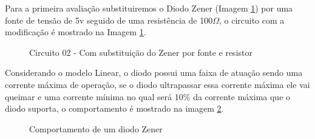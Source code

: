 Para a primeira avaliação substituiremos o Diodo Zener (Imagem \ref{fig:Circuito02}) por uma fonte de tensão de 5v seguido de uma resistência de 100$\Omega$, o circuito com a modificação é mostrado na Imagem \ref{fig:Circuito02}.

\begin{figure}[H]
    \centering
    \caption{Circuito 02 - Com substituição do Zener por fonte e resistor}
    \vspace{-0.3cm}
    \label{fig:Circuito02}
\end{figure}

Considerando o modelo Linear, o diodo possui uma faixa de atuação sendo uma corrente máxima de operação, se o diodo ultrapassar essa corrente máxima ele vai queimar e uma corrente mínima no qual será 10\% da corrente máxima que o diodo suporta, o comportamento é mostrado na imagem \ref{fig:comportamentoZener}.

\begin{figure}[H]
    \centering
    \caption{Comportamento de um diodo Zener}
    \vspace{-0.3cm}
    \label{fig:comportamentoZener}
\end{figure}

